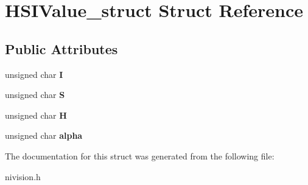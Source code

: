 \hypertarget{structHSIValue__struct}{\section{\-H\-S\-I\-Value\-\_\-struct \-Struct \-Reference}
\label{structHSIValue__struct}
}
\subsection*{\-Public \-Attributes}
\begin{DoxyCompactItemize}
\item 
\hypertarget{structHSIValue__struct_acf9b0ddb930275bce308229fb95942ab}{unsigned char {\bfseries \-I}}\label{structHSIValue__struct_acf9b0ddb930275bce308229fb95942ab}

\item 
\hypertarget{structHSIValue__struct_af821e59a7ae0fc8c4c44e78960105d08}{unsigned char {\bfseries \-S}}\label{structHSIValue__struct_af821e59a7ae0fc8c4c44e78960105d08}

\item 
\hypertarget{structHSIValue__struct_a1aee48849414a70770953200526c4789}{unsigned char {\bfseries \-H}}\label{structHSIValue__struct_a1aee48849414a70770953200526c4789}

\item 
\hypertarget{structHSIValue__struct_aca41fd8feaeb0dce4e7b79d117c3e630}{unsigned char {\bfseries alpha}}\label{structHSIValue__struct_aca41fd8feaeb0dce4e7b79d117c3e630}

\end{DoxyCompactItemize}


\-The documentation for this struct was generated from the following file\-:\begin{DoxyCompactItemize}
\item 
nivision.\-h\end{DoxyCompactItemize}
